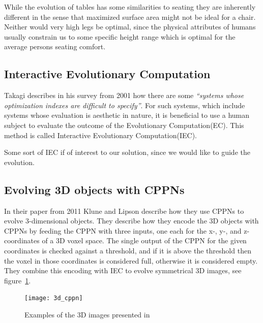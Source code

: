 While the evolution of tables has some similarities to seating they are inherently
different in the sense that maximized surface area might not be ideal for a
chair.
Neither would very high legs be optimal, since the physical attributes of humans
usually constrain us to some specific height range which is optimal for the
average persons seating comfort.

\subsection{Interactive Evolutionary Computation}
Takagi describes in his survey from 2001\cite{Takagi2001} how there are some \emph{``systems whose optimization indexes are difficult to specify''}\cite[p.~1275]{Takagi2001}.
For such systems, which include systems whose evaluation is aesthetic in nature, it is beneficial to use a human subject to evaluate the outcome of the Evolutionary Computation(EC).
This method is called Interactive Evolutionary Computation(IEC).

Some sort of IEC if of interest to our solution, since we would like to guide the evolution. 

\subsection{Evolving 3D objects with CPPNs}
In their paper from 2011 Klune and Lipson describe how they use CPPNs to evolve 3-dimensional objects\cite{Clune:2011:EOG:2078245.2078246}.
They describe how they encode the 3D objects with CPPNs by feeding the CPPN with three inputs, one each for the x-, y-, and z-coordinates of a 3D voxel space.
The single output of the CPPN for the given coordinates is checked against a threshold, and if it is above the threshold then the voxel in those coordinates is considered full, otherwise it is considered empty\cite[p.~5]{Clune:2011:EOG:2078245.2078246}.
They combine this encoding with IEC to evolve symmetrical 3D images, see figure~\ref{fig:3dobjects}.
\begin{figure}[ht]
\centering
\texttt{[image: 3d\_cppn]}
\caption{Examples of the 3D images presented in \cite{Clune:2011:EOG:2078245.2078246}}
\label{fig:3dobjects}
\end{figure}


